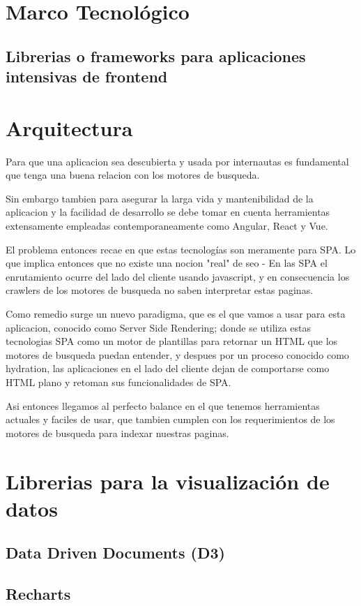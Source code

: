 \section{Marco Tecnológico}



\subsection{Librerias o frameworks para aplicaciones intensivas de frontend }

\section{Arquitectura}

Para que una aplicacion sea descubierta y usada por internautas es fundamental que tenga una buena relacion con los motores de busqueda.

Sin embargo tambien para asegurar la larga vida y mantenibilidad de la aplicacion y la facilidad de desarrollo se debe tomar en cuenta herramientas extensamente empleadas contemporaneamente como Angular, React y Vue.

El problema entonces recae en que estas tecnologías son meramente para SPA. Lo que implica entonces que no existe una nocion "real" de seo - En las SPA el enrutamiento ocurre del lado del cliente usando javascript, y en consecuencia los crawlers de los motores de busqueda no saben interpretar estas paginas.

Como remedio surge un nuevo paradigma, que es el que vamos a usar para esta aplicacion, conocido como Server Side Rendering; donde se utiliza estas tecnologias SPA como un motor de plantillas para retornar un HTML que los motores de busqueda puedan entender, y despues por un proceso conocido como hydration, las aplicaciones en el lado del cliente dejan de comportarse como HTML plano y retoman sus funcionalidades de SPA.

Asi entonces llegamos al perfecto balance en el que tenemos herramientas actuales y faciles de usar, que tambien cumplen con los requerimientos de los motores de busqueda para indexar nuestras paginas.

\section{Librerias para la visualización de datos}

\subsection{ Data Driven Documents (D3) }

\subsection{ Recharts }

\subsection{  }

